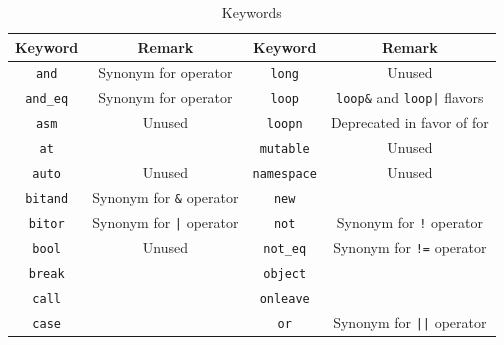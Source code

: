 \documentclass[openright,twoside,12pt]{report}
\begin{document}
\renewcommand{\baselinestretch}{.85}
\begin{table}[htp]
  \caption{Keywords}
  \label{tab:keywords}
  \centering
  \begin{tabular}{|c|c||c|c|}
    \hline
    Keyword                       & Remark                                  &
    Keyword                       & Remark                                  \\
    \hline
    \lstinline"and"               & Synonym for  operator                   &
    \lstinline"long"              & Unused                                  \\
    \lstinline"and_eq"            & Synonym for  operator                   &
    \lstinline"loop"              & \lstinline|loop&| and
                                    \lstinline-loop|- flavors               \\
    \lstinline"asm"               & Unused                                  &
    \lstinline"loopn"             & Deprecated in favor of for              \\
    \lstinline"at"                &                                         &
    \lstinline"mutable"           & Unused                                  \\
    \lstinline"auto"              & Unused                                  &
    \lstinline"namespace"         & Unused                                  \\
    \lstinline"bitand"            & Synonym for \lstinline|&| operator      &
    \lstinline"new"               &                                         \\
    \lstinline"bitor"             & Synonym for \lstinline-|- operator      &
    \lstinline"not"               & Synonym for \lstinline|!| operator      \\
    \lstinline"bool"              & Unused                                  &
    \lstinline"not_eq"            & Synonym for \lstinline|!=| operator     \\
    \lstinline"break"             &                                         &
    \lstinline"object"            &                                         \\
    \lstinline"call"              &                                         &
    \lstinline"onleave"           &                                         \\
    \lstinline"case"              &                                         &
    \lstinline"or"                & Synonym for \lstinline-||- operator     \\

\end{tabular}
\end{table}
\end{document}

